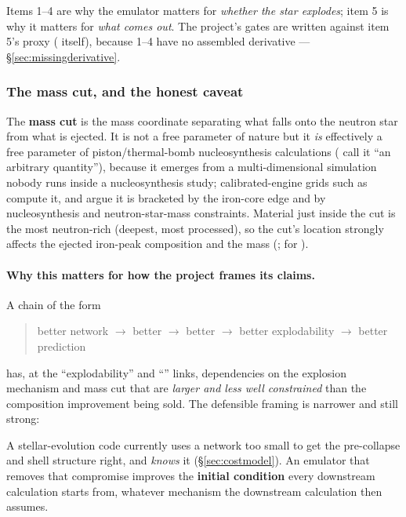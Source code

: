 Items 1--4 are why the emulator matters for \emph{whether the star explodes};
item 5 is why it matters for \emph{what comes out}. The project's gates are
written against item 5's proxy (\Ye{} itself), because 1--4 have no assembled
derivative --- \S\ref{sec:missingderivative}.

\subsubsection{The mass cut, and the honest caveat}
\label{sec:masscut}

The \textbf{mass cut} is the mass coordinate separating what falls onto the
neutron star from what is ejected. It is not a free parameter of nature but it
\emph{is} effectively a free parameter of piston/thermal-bomb nucleosynthesis
calculations (\citealt{boccioli2024} call it ``an arbitrary quantity''),
because it emerges from a multi-dimensional simulation nobody runs inside a
nucleosynthesis study; calibrated-engine grids such as \citet{sukhbold2016}
compute it, and \citet{woosley2007} argue it is bracketed by the iron-core
edge and by nucleosynthesis and neutron-star-mass constraints. Material just
inside the cut is the most neutron-rich (deepest, most processed), so the cut's
location strongly affects the ejected iron-peak composition and the
 mass (\citealt{woosley2007}; \citealt{the1998} for ).

\paragraph{Why this matters for how the project frames its claims.} A chain of
the form

\begin{quote}
better network $\to$ better \Ye{} $\to$ better \Mch{} $\to$ better
explodability $\to$ better  prediction
\end{quote}

has, at the ``explodability'' and ``'' links, dependencies on the
explosion mechanism and mass cut that are \emph{larger and less well
constrained} than the composition improvement being sold. The defensible
framing is narrower and still strong:

\begin{result}
A stellar-evolution code currently uses a network too small to get the
pre-collapse \Ye{} and shell structure right, and \emph{knows} it
(\S\ref{sec:costmodel}). An emulator that removes that compromise improves the
\textbf{initial condition} every downstream calculation starts from, whatever
mechanism the downstream calculation then assumes.
\end{result}

